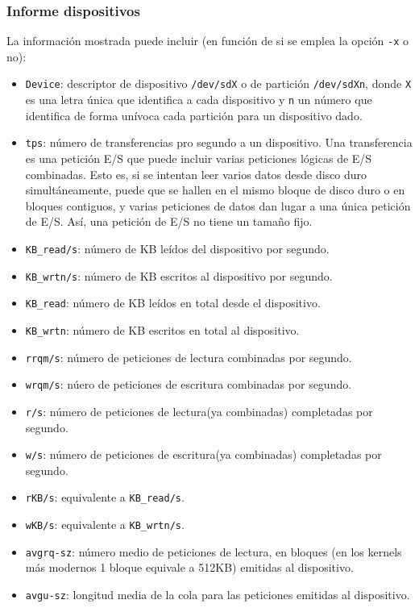 \documentclass[a4paper,10pt]{article}
\begin{document}
\subsubsection{Informe dispositivos}
\label{optdisp}
La información mostrada puede incluir (en función de si se emplea la opción \texttt{-x} o no):
\begin{itemize}
 \item{\texttt{Device}}: descriptor de dispositivo \texttt{/dev/sdX} o de partición \texttt{/dev/sdXn}, donde \texttt{X} es una
 letra única que identifica a cada dispositivo y \texttt{n} un número que identifica de forma unívoca cada partición para un
 dispositivo dado.
 \item{\texttt{tps}}: número de transferencias pro segundo a un dispositivo. Una transferencia es una petición E/S que puede
 incluir varias peticiones lógicas de E/S combinadas. Esto es, si se intentan leer varios datos desde disco duro simultáneamente,
 puede que se hallen en el mismo bloque de disco duro o en bloques contiguos, y varias peticiones de datos dan lugar a una única
 petición de E/S. Así, una petición de E/S no tiene un tamaño fijo.
 \item{\texttt{KB\_read/s}}: número de KB leídos del dispositivo por segundo.
 \item{\texttt{KB\_wrtn/s}}: número de KB escritos al dispositivo por segundo.
 \item{\texttt{KB\_read}}: número de KB leídos en total desde el dispositivo.
 \item{\texttt{KB\_wrtn}}: número de KB escritos en total al dispositivo.
 \item{\texttt{rrqm/s}}: número de peticiones de lectura combinadas por segundo.
 \item{\texttt{wrqm/s}}: núero de peticiones de escritura combinadas por segundo.
 \item{\texttt{r/s}}: número de peticiones de lectura(ya combinadas) completadas por segundo.
 \item{\texttt{w/s}}: número de peticiones de escritura(ya combinadas) completadas por segundo.
 \item{\texttt{rKB/s}}: equivalente a \texttt{KB\_read/s}.
 \item{\texttt{wKB/s}}: equivalente a \texttt{KB\_wrtn/s}.
 \item{\texttt{avgrq-sz}}: número medio de peticiones de lectura, en bloques (en los kernels más modernos 1 bloque equivale a 512KB) emitidas
 al dispositivo.
 \item{\texttt{avgu-sz}}: longitud media de la cola para las peticiones emitidas al dispositivo.

\end{itemize}
\end{document}
